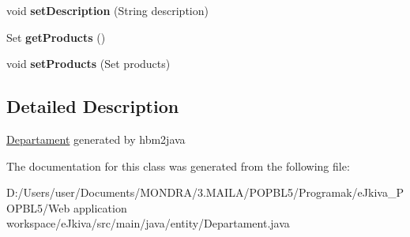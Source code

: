 \begin{DoxyCompactItemize}
\mbox{\label{classentity_1_1_departament_a4ffc7e3a45ab3a5878e3c1fa65695078}} 
void {\bfseries set\+Description} (String description)
\item 
\mbox{\label{classentity_1_1_departament_a54994f6d08777e9a90cb8ca2afe7c424}} 
Set {\bfseries get\+Products} ()
\item 
\mbox{\label{classentity_1_1_departament_a35fb7482cd77c6b83765606724be74b6}} 
void {\bfseries set\+Products} (Set products)
\end{DoxyCompactItemize}


\subsection{Detailed Description}
\mbox{\hyperlink{classentity_1_1_departament}{Departament}} generated by hbm2java 

The documentation for this class was generated from the following file\+:\begin{DoxyCompactItemize}
\item 
D\+:/\+Users/user/\+Documents/\+M\+O\+N\+D\+R\+A/3.\+M\+A\+I\+L\+A/\+P\+O\+P\+B\+L5/\+Programak/e\+Jkiva\+\_\+\+P\+O\+P\+B\+L5/\+Web application workspace/e\+Jkiva/src/main/java/entity/Departament.\+java\end{DoxyCompactItemize}
